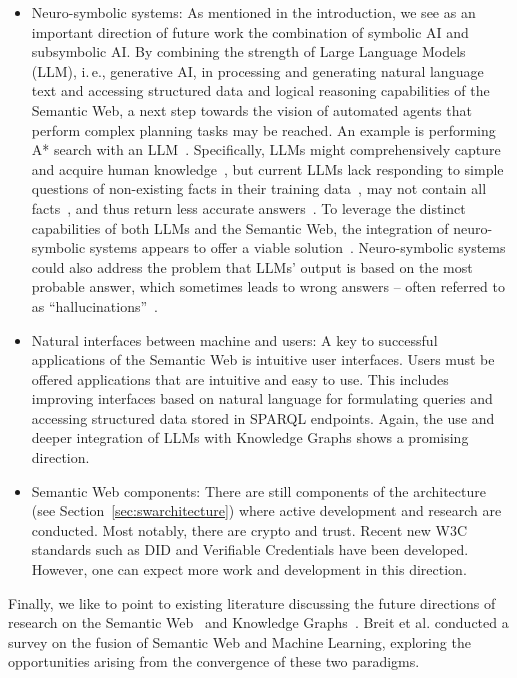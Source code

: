 \documentclass[a4paper,USenglish]{tgdk-v2021}
\begin{document}
\begin{itemize}
    \item Neuro-symbolic systems: As mentioned in the introduction, we see as an important direction of future work the combination of symbolic AI and subsymbolic AI.
    By combining the strength of Large Language Models (LLM), i.\,e., generative AI, in processing and generating natural language text and accessing structured data and logical reasoning capabilities of the Semantic Web, a next step towards the vision of automated agents that perform complex planning tasks may be reached.
    An example is performing A* search with an LLM~\cite{DBLP:journals/corr/abs-2310-13227-toolchainstar}.
 Specifically, LLMs might comprehensively capture and acquire human knowledge~\cite{10.1145/3608966}, but current LLMs lack responding to simple questions of non-existing facts in their training data~\cite{10.1145/3608966}, may not contain all facts~\cite{DBLP:journals/corr/abs-2308-10168}, and thus return less accurate answers~\cite{Hou2023-fo}.
To leverage the distinct capabilities of both LLMs and the Semantic Web, the integration of neuro-symbolic systems appears to offer a viable solution~\cite{DBLP:journals/corr/abs-2306-08302}. 
Neuro-symbolic systems could also address the problem that LLMs' output is based on the most probable answer, which sometimes leads to wrong answers -- often referred to as ``hallucinations''~\cite{DBLP:journals/corr/abs-2302-04023,DBLP:conf/adbis/Hose23,DBLP:journals/corr/abs-2308-10168}. 
    \item Natural interfaces between machine and users: 
    A key to successful applications of the Semantic Web is intuitive user interfaces.
    Users must be offered applications that are intuitive and easy to use.
    This includes improving interfaces based on natural language for formulating queries and accessing structured data stored in SPARQL endpoints.
    Again, the use and deeper integration of LLMs with Knowledge Graphs shows a promising direction.
    \item Semantic Web components: There are still components of the architecture (see Section~\ref{sec:swarchitecture}) where active development and research are conducted.
    Most notably, there are crypto and trust. 
    Recent new W3C standards such as DID and Verifiable Credentials have been developed. 
    However, one can expect more work and development in this direction.
\end{itemize}

Finally, we like to point to existing literature discussing the future directions of research on the Semantic Web~\cite{DBLP:journals/corr/abs-2309-13939} and Knowledge Graphs~\cite{DBLP:journals/corr/abs-2308-14217}.
Breit et al. \cite{10.1145/3586163} conducted a survey on the fusion of Semantic Web and Machine Learning, exploring the opportunities arising from the convergence of these two paradigms.
\end{document}
